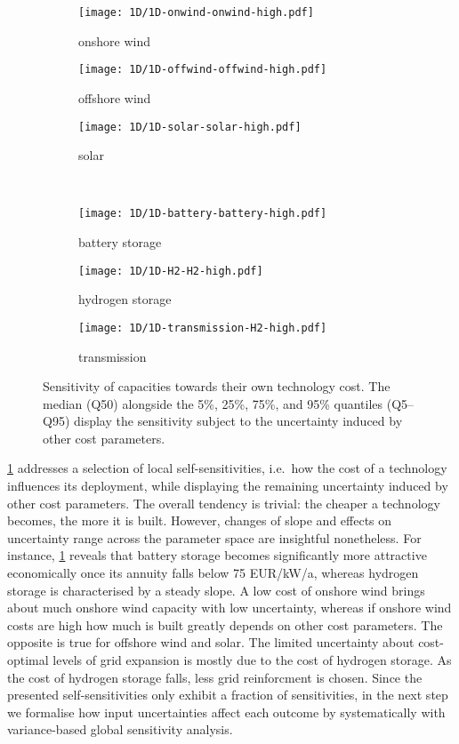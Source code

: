 \begin{figure}
    \begin{subfigure}[t]{0.32\textwidth}
        \caption{onshore wind}
        \texttt{[image: 1D/1D-onwind-onwind-high.pdf]}
    \end{subfigure}
    \begin{subfigure}[t]{0.32\textwidth}
        \caption{offshore wind}
        \texttt{[image: 1D/1D-offwind-offwind-high.pdf]}
    \end{subfigure}
    \begin{subfigure}[t]{0.32\textwidth}
        \caption{solar}
        \texttt{[image: 1D/1D-solar-solar-high.pdf]}
    \end{subfigure} \\
    \begin{subfigure}[t]{0.32\textwidth}
        \caption{battery storage}
        \texttt{[image: 1D/1D-battery-battery-high.pdf]}
    \end{subfigure}
    \begin{subfigure}[t]{0.32\textwidth}
        \caption{hydrogen storage}
        \texttt{[image: 1D/1D-H2-H2-high.pdf]}
    \end{subfigure}
    \begin{subfigure}[t]{0.32\textwidth}
        \caption{transmission}
        \texttt{[image: 1D/1D-transmission-H2-high.pdf]}
    \end{subfigure}
    \caption{
      Sensitivity of capacities towards their own technology cost.
      The median (Q50) alongside the 5\%, 25\%, 75\%, and 95\% quantiles (Q5--Q95) display
      the sensitivity subject to the uncertainty induced by other cost parameters.
    }
    \label{fig:sensitivity}
\end{figure}

\cref{fig:sensitivity} addresses a selection of local self-sensitivities, i.e.~how the cost of a technology influences its deployment,
while displaying the remaining uncertainty induced by other cost parameters.
The overall tendency is trivial: the cheaper a technology becomes, the more it is built.
However, changes of slope and effects on uncertainty range across the parameter space are insightful nonetheless.
For instance, \cref{fig:sensitivity} reveals that battery storage becomes significantly more 
attractive economically once its annuity falls below 75 EUR/kW/a, whereas hydrogen storage is
characterised by a steady slope.
A low cost of onshore wind brings about much onshore wind capacity with low uncertainty,
whereas if onshore wind costs are high how much is built greatly depends on other cost parameters.
The opposite is true for offshore wind and solar. 
The limited uncertainty about cost-optimal levels of grid expansion is mostly due to the cost of hydrogen storage.
As the cost of hydrogen storage falls, less grid reinforcment is chosen.
Since the presented self-sensitivities only exhibit a fraction of sensitivities,
in the next step we formalise how input uncertainties affect each outcome by 
systematically with variance-based global sensitivity analysis.


